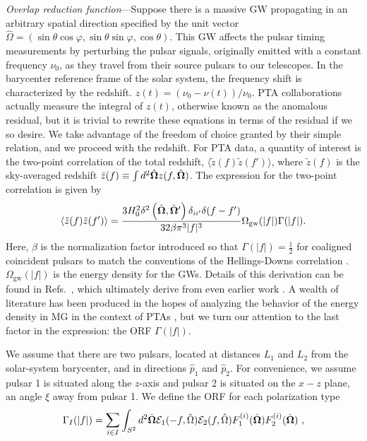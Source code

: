 \documentclass[prd,twocolumn,aps,psfig,nofootinbib,nobibnotes,superscriptaddress,preprintnumbers,times]{revtex4-2}
\begin{document}
\textit{Overlap reduction function}---Suppose there is a massive GW propagating in an arbitrary spatial direction specified by the unit vector $\hat{\Omega} = (                     \sin\theta \cos\varphi,
                        \sin\theta \sin\varphi,
                        \cos\theta)$.
This GW affects the pulsar timing measurements by perturbing the pulsar signals, originally emitted with a constant frequency $\nu_0$, as they travel from their source pulsars to our telescopes. In the barycenter reference frame of the solar system, the frequency shift is characterized by the redshift.
$z(t) = (\nu_0 - \nu(t))/\nu_0$.
PTA collaborations actually measure the integral of $z(t)$, otherwise known as the anomalous residual, 
but it is trivial to rewrite these equations in terms of the residual if we so desire. We take advantage of the freedom of choice granted by their simple relation, and we proceed with the redshift. For PTA data, a quantity of interest is the two-point correlation of the total redshift, $\langle \tilde{z}(f) \tilde{z}(f') \rangle$, where $\tilde{z}(f)$ is the sky-averaged redshift $\tilde{z}(f) \equiv \int d^2\hat{\bf \Omega} z(f, \hat{\bf \Omega})$. The expression for the two-point correlation is given by
\begin{equation}\label{eqn:two_point_z}
    \langle \tilde{z}(f) \tilde{z}(f') \rangle = \frac{3H_0^2\delta^2\left(\hat{\bf \Omega} , \hat{\bf \Omega}'\right)\delta_{ii'}\delta(f - f')}{32 \beta \pi^3|f|^3}\Omega_{\text{gw}}(|f|) \Gamma(|f|).
\end{equation}
Here, $\beta$ is the normalization factor introduced so that $\Gamma(|f|) = \frac{1}{2}$ for coaligned coincident pulsars to match the conventions of the Hellings-Downs correlation \cite{Romano:2023zhb}. $\Omega_{\text{gw}}(|f|)$ is the energy density for the GWs. Details of this derivation can be found in Refs.\ \cite{Anholm:2008wy, Liang:2021bct}, which ultimately derive from even earlier work \cite{Detweiler:1979wn, Estabrook:1975jtn, Kaufmann:1970}. A wealth of literature has been produced in the hopes of analyzing the behavior of the energy density in MG in the context of PTAs \cite{Choi:2023tun, Wu:2023rib, Kenjale:2024rsc, He:2021bqm}, but we turn our attention to the last factor in the expression: the ORF $\Gamma(|f|)$. 

We assume that there are two pulsars, located at distances $L_1$ and $L_2$ from the solar-system barycenter, and in directions $\hat{p}_1$ and $\hat{p}_2$. For convenience, we assume pulsar 1 is situated along the $z$-axis and pulsar 2 is situated on the $x-z$ plane, an angle $\xi$ away from pulsar 1. We define the ORF for each polarization type
\begin{equation}\label{eq:orf_type}
    \Gamma_I(|f|) = \mathlarger{\sum}_{i \in I} \int_{S^2} d^2 \hat{\bf{\Omega}} \mathcal{E}_1(-f, \hat{\Omega}) \mathcal{E}_2(f, \hat{\Omega}) F_1^{(i)}(\hat{\bf{\Omega}}) F_2^{(i)}(\hat{\bf{\Omega}}) \ ,
\end{equation}
\end{document}
